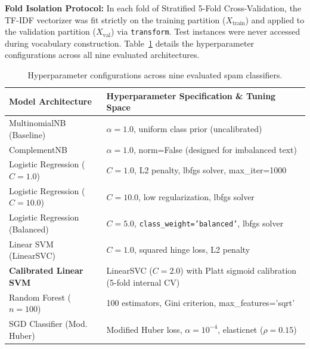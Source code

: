 \documentclass[9.5pt,twocolumn,letterpaper]{article}
\begin{document}
\textbf{Fold Isolation Protocol:} In each fold of Stratified 5-Fold Cross-Validation, the TF-IDF vectorizer was fit strictly on the training partition ($X_{\text{train}}$) and applied to the validation partition ($X_{\text{val}}$) via \texttt{transform}. Test instances were never accessed during vocabulary construction. Table~\ref{tab:model_specs} details the hyperparameter configurations across all nine evaluated architectures.

\begin{table}[htbp]
\centering
\scriptsize
\setlength{\tabcolsep}{2.5pt}
\renewcommand{\arraystretch}{1.08}
\begin{tabularx}{\columnwidth}{l X}
\toprule
\textbf{Model Architecture} & \textbf{Hyperparameter Specification \& Tuning Space} \\
\midrule
MultinomialNB (Baseline) & $\alpha=1.0$, uniform class prior (uncalibrated) \\
ComplementNB & $\alpha=1.0$, norm=False (designed for imbalanced text) \\
Logistic Regression ($C=1.0$) & $C=1.0$, L2 penalty, lbfgs solver, max\_iter=1000 \\
Logistic Regression ($C=10.0$) & $C=10.0$, low regularization, lbfgs solver \\
Logistic Regression (Balanced) & $C=5.0$, \texttt{class\_weight='balanced'}, lbfgs solver \\
Linear SVM (LinearSVC) & $C=1.0$, squared hinge loss, L2 penalty \\
\textbf{Calibrated Linear SVM} & LinearSVC ($C=2.0$) with Platt sigmoid calibration (5-fold internal CV) \\
Random Forest ($n=100$) & 100 estimators, Gini criterion, max\_features='sqrt' \\
SGD Classifier (Mod. Huber) & Modified Huber loss, $\alpha=10^{-4}$, elasticnet ($\rho=0.15$) \\
\bottomrule
\end{tabularx}
\caption{Hyperparameter configurations across nine evaluated spam classifiers.}
\label{tab:model_specs}
\end{table}
\end{document}
